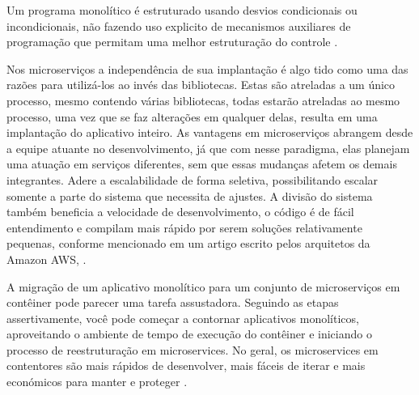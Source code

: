 Um programa monolítico é estruturado usando desvios condicionais ou incondicionais, não fazendo uso explicito de mecanismos
auxiliares de programação que permitam uma melhor estruturação do
controle \cite{teoria-da-computacao-3ed-ufrgs-maquinas-universais-e-computabilidade}.


Nos microserviços a independência de sua implantação é algo tido como uma das razões para utilizá-los ao invés das
bibliotecas. Estas são atreladas a um único processo, mesmo contendo várias bibliotecas, todas estarão atreladas ao mesmo
processo, uma vez que se faz alterações em qualquer delas, resulta em uma implantação do aplicativo inteiro.
As vantagens em microserviços abrangem desde a equipe atuante no desenvolvimento, já que com nesse paradigma, elas planejam
uma atuação em serviços diferentes, sem que essas mudanças afetem os demais integrantes. Adere a escalabilidade de forma
seletiva, possibilitando escalar somente a parte do sistema que necessita de ajustes.
A divisão do sistema também beneficia a velocidade de desenvolvimento, o código é de fácil entendimento e
compilam mais rápido por serem soluções relativamente pequenas, conforme mencionado em um artigo escrito pelos
arquitetos da Amazon AWS, .

\begin{citacao}
A migração de um aplicativo monolítico para um conjunto de microserviços em contêiner pode parecer uma tarefa assustadora.
Seguindo as etapas assertivamente, você pode começar a contornar aplicativos monolíticos, aproveitando o ambiente de tempo
de execução do contêiner e iniciando o processo de reestruturação em microservices. No geral, os microservices em
contentores são mais rápidos de desenvolver, mais fáceis de iterar e mais económicos para manter e
proteger \cite{deploying-java-microservices-on-amazon-ec2-container-service}.
\end{citacao}
